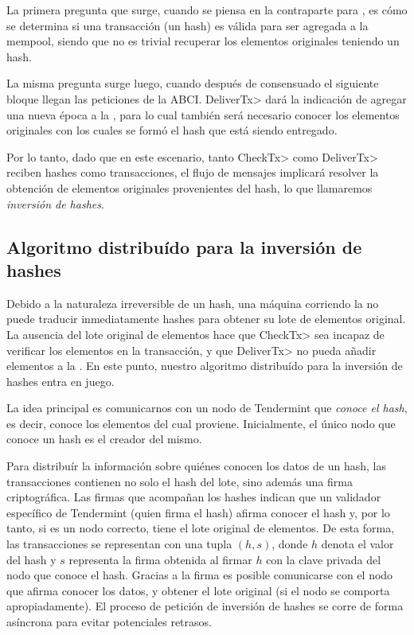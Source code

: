 %

La primera pregunta que surge, cuando se piensa en la contraparte para \hashchain, es cómo se determina si una
transacción (un hash) es válida para ser agregada a la mempool, siendo que no es trivial recuperar los
elementos originales teniendo un hash.

%

La misma pregunta surge luego,
cuando después de consensuado el siguiente bloque llegan las peticiones de la ABCI.
%
\<DeliverTx> dará la indicación de agregar una nueva época a la \setchain, para lo cual también
será necesario conocer los elementos originales con los cuales se formó el hash que está siendo entregado.

Por lo tanto, dado que en este escenario, tanto \<CheckTx> como \<DeliverTx> reciben hashes como transacciones,
el flujo de mensajes implicará resolver la obtención de elementos originales provenientes del hash, lo que llamaremos
\textit{inversión de hashes}.


\subsection{Algoritmo distribuído para la inversión de hashes}

%
%
Debido a la naturaleza irreversible de un hash, una máquina corriendo la \setchain no puede traducir
inmediatamente hashes para obtener su lote de elementos original.
%
La ausencia del lote original de elementos hace que \<CheckTx> sea incapaz de verificar los elementos
en la transacción, y que \<DeliverTx> no pueda añadir elementos a la \setchain.
%
En este punto, nuestro algoritmo distribuído para la inversión de hashes entra en juego.
%

La idea principal es comunicarnos con un nodo de Tendermint que \textit{conoce el hash}, es decir,
conoce los elementos del cual proviene.
%
Inicialmente, el único nodo que conoce un hash es el creador del mismo.
%

Para distribuír la información sobre quiénes conocen los datos de un hash, las transacciones contienen
no solo el hash del lote, sino además una firma criptográfica.
%
Las firmas que acompañan los hashes indican que un validador específico de Tendermint
(quien firma el hash) afirma conocer el hash y, por lo tanto, si es un nodo correcto,
tiene el lote original de elementos.
%
De esta forma, las transacciones se representan con una tupla $(h, s)$, donde $h$ denota
el valor del hash y $s$ representa la firma obtenida al firmar $h$ con la clave privada
del nodo que conoce el hash.
%
Gracias a la firma es posible comunicarse con el nodo que afirma conocer los datos, y obtener
el lote original (si el nodo se comporta apropiadamente).
%
El proceso de petición de inversión de hashes se corre de forma asíncrona para evitar potenciales
retrasos.

